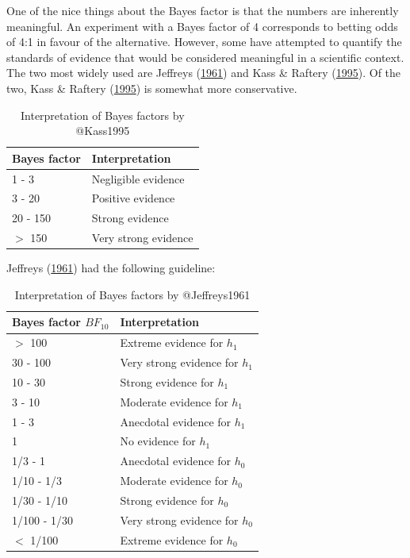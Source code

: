 \documentclass[
]{book}
\theoremstyle{definition}
\theoremstyle{definition}
\theoremstyle{definition}
\theoremstyle{definition}
\theoremstyle{remark}
\begin{document}
One of the nice things about the Bayes factor is that the numbers are inherently meaningful. An experiment with a Bayes factor of 4 corresponds to betting odds of 4:1 in favour of the alternative. However, some have attempted to quantify the standards of evidence that would be considered meaningful in a scientific context. The two most widely used are Jeffreys (\protect\hyperlink{ref-Jeffreys1961}{1961}) and Kass \& Raftery (\protect\hyperlink{ref-Kass1995}{1995}). Of the two, Kass \& Raftery (\protect\hyperlink{ref-Kass1995}{1995}) is somewhat more conservative.

\begin{table}

\caption{\label{tab:unnamed-chunk-115}Interpretation of Bayes factors by @Kass1995}
\centering
\begin{tabular}[t]{ll}
\toprule
Bayes factor & Interpretation\\
\midrule
1 - 3 & Negligible evidence\\
3 - 20 & Positive evidence\\
20 - 150 & Strong evidence\\
$>$ 150 & Very strong evidence\\
\bottomrule
\end{tabular}
\end{table}

Jeffreys (\protect\hyperlink{ref-Jeffreys1961}{1961}) had the following guideline:

\begin{table}

\caption{\label{tab:unnamed-chunk-116}Interpretation of Bayes factors by @Jeffreys1961}
\centering
\begin{tabular}[t]{ll}
\toprule
Bayes factor $BF_10$ & Interpretation\\
\midrule
$>$ 100 & Extreme evidence for $h_1$\\
30 - 100 & Very strong evidence for $h_1$\\
10 - 30 & Strong evidence for $h_1$\\
3 - 10 & Moderate evidence for $h_1$\\
1 - 3 & Anecdotal evidence for $h_1$\\
1 & No evidence for $h_1$\\
1/3 - 1 & Anecdotal evidence for $h_0$\\
1/10 - 1/3 & Moderate evidence for $h_0$\\
1/30 - 1/10 & Strong evidence for $h_0$\\
1/100 - 1/30 & Very strong evidence for $h_0$\\
$<$ 1/100 & Extreme evidence for $h_0$\\
\bottomrule
\end{tabular}
\end{table}
\end{document}
